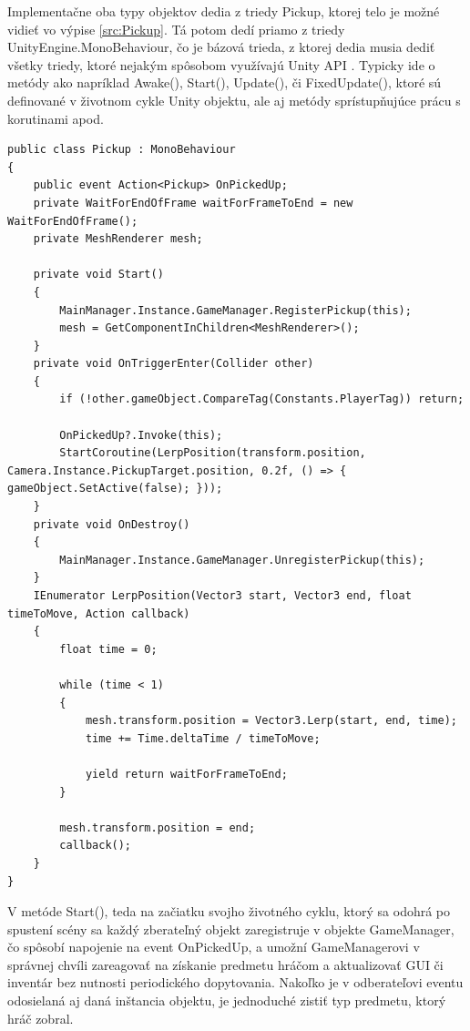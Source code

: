 \documentclass[slovak, master]{diploma}
\begin{document}
Implementačne oba typy objektov dedia z triedy Pickup, ktorej telo je možné vidieť vo výpise \ref{src:Pickup}. Tá potom dedí priamo z triedy UnityEngine.MonoBehaviour, čo je bázová trieda, z ktorej dedia musia dediť všetky triedy, ktoré nejakým spôsobom využívajú Unity API \cite{MonoBehaviour}. Typicky ide o metódy ako napríklad Awake(), Start(), Update(), či FixedUpdate(), ktoré sú definované v životnom cykle Unity objektu, ale aj metódy sprístupňujúce prácu s korutinami apod.
\vspace{8pt}
\begin{lstlisting}[label=src:Pickup,caption={Trieda Pickup slúžiaca ako predok všetkých zberateľných predmetov v hre}]
public class Pickup : MonoBehaviour
{
    public event Action<Pickup> OnPickedUp;
    private WaitForEndOfFrame waitForFrameToEnd = new WaitForEndOfFrame();
    private MeshRenderer mesh;

    private void Start() 
    {
        MainManager.Instance.GameManager.RegisterPickup(this);
        mesh = GetComponentInChildren<MeshRenderer>();
    }
    private void OnTriggerEnter(Collider other) 
    {
        if (!other.gameObject.CompareTag(Constants.PlayerTag)) return;

        OnPickedUp?.Invoke(this);
        StartCoroutine(LerpPosition(transform.position, Camera.Instance.PickupTarget.position, 0.2f, () => { gameObject.SetActive(false); }));
    }
    private void OnDestroy() 
    {
        MainManager.Instance.GameManager.UnregisterPickup(this);
    }
    IEnumerator LerpPosition(Vector3 start, Vector3 end, float timeToMove, Action callback) 
    {
        float time = 0;

        while (time < 1)
        {
            mesh.transform.position = Vector3.Lerp(start, end, time);
            time += Time.deltaTime / timeToMove;

            yield return waitForFrameToEnd;
        }

        mesh.transform.position = end;
        callback();
    }
}
\end{lstlisting}

V metóde Start(), teda na začiatku svojho životného cyklu, ktorý sa odohrá po spustení scény sa každý zberateľný objekt zaregistruje v objekte GameManager, čo spôsobí napojenie na event OnPickedUp, a umožní GameManagerovi v správnej chvíli zareagovať na získanie predmetu hráčom a aktualizovať GUI či inventár bez nutnosti periodického dopytovania. Nakoľko je v odberateľovi eventu odosielaná aj daná inštancia objektu, je jednoduché zistiť typ predmetu, ktorý hráč zobral.
\end{document}
